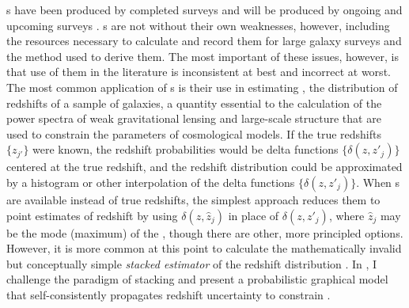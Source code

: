 


\Pzpdf s have been produced by completed surveys \citep{Hildebrandt2012, Sheldon2012} and will be produced by ongoing and upcoming surveys \citep{LSSTScienceCollaboration2009, CarrascoKind2014a, Bonnett2015, Masters2015}.  
\Pzpdf s are not without their own weaknesses, however, including the resources necessary to calculate and record them for large galaxy surveys \citep{CarrascoKind2014} and the method used to derive them.  
The most important of these issues, however, is that use of them in the literature is inconsistent at best and incorrect at worst.  
The most common application of \pzpdf s is their use in estimating \Nz, the distribution of redshifts of a sample of galaxies, a quantity essential to the calculation of the power spectra of weak gravitational lensing and large-scale structure that are used to constrain the parameters of cosmological models.
If the true redshifts $\{z_{j'}\}$ were known, the redshift probabilities would be delta functions $\{\delta(z, z'_{j})\}$ centered at the true redshift, and the redshift distribution could be approximated by a histogram or other interpolation of the delta functions $\{\delta(z, z'_{j})\}$.
When \pzpdf s are available instead of true redshifts, the simplest approach reduces them to point estimates of redshift by using $\delta(z, \hat{z}_{j})$ in place of $\delta(z, z'_{j})$, where $\hat{z}_{j}$ may be the mode (maximum) of the \pzpdf, though there are other, more principled options.
However, it is more common at this point to calculate the mathematically invalid but conceptually simple \textit{stacked estimator} of the redshift distribution \citep{Lima2008}.
In , I challenge the paradigm of stacking and present a probabilistic graphical model that self-consistently propagates redshift uncertainty to constrain \Nz.

